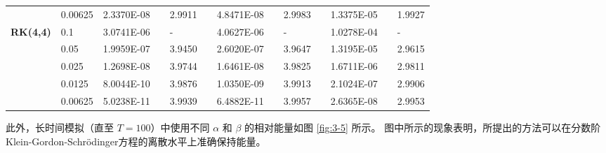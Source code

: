 \begin{table}[H]
\begin{tabular}{lllllrlrlrlrlrl}
	\multicolumn{2}{l}{} & \multicolumn{2}{l}{0.00625} & 2.3370E-08 &       & 2.9911  &       & 4.8471E-08 &       & 2.9983  &       & 1.3375E-05 &       & 1.9927  \\
	\multicolumn{2}{l}{\multirow{5}[1]{*}{\textbf{RK(4,4)}}} & \multicolumn{2}{l}{0.1} & 3.0741E-06 &       & -     &       & 4.0627E-06 &       & -     &       & 1.0278E-04 &       & - \\
	\multicolumn{2}{l}{} & \multicolumn{2}{l}{0.05} & 1.9959E-07 &       & 3.9450  &       & 2.6020E-07 &       & 3.9647  &       & 1.3195E-05 &       & 2.9615  \\
	\multicolumn{2}{l}{} & \multicolumn{2}{l}{0.025} & 1.2698E-08 &       & 3.9744  &       & 1.6461E-08 &       & 3.9825  &       & 1.6711E-06 &       & 2.9811  \\
	\multicolumn{2}{l}{} & \multicolumn{2}{l}{0.0125} & 8.0044E-10 &       & 3.9876  &       & 1.0350E-09 &       & 3.9913  &       & 2.1024E-07 &       & 2.9906  \\
	\multicolumn{2}{l}{} & \multicolumn{2}{l}{0.00625} & 5.0238E-11 &       & 3.9939  &       & 6.4882E-11 &       & 3.9957  &       & 2.6365E-08 &       & 2.9953  \\
	\bottomrule
	\end{tabular}%
	\label{tab:6-4}%
	\end{table}%

	此外，长时间模拟（直至 $T=100$）中使用不同 $\alpha$ 和 $\beta$ 的相对能量如图 \ref{fig:3-5} 所示。
图中所示的现象表明，所提出的方法可以在分数阶Klein-Gordon-Schr{\"o}dinger方程的离散水平上准确保持能量。

